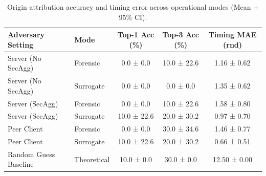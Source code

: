 \begin{table}[t]
\centering
\small
\caption{Origin attribution accuracy and timing error across operational modes (Mean $\pm$ 95\% CI).}
\label{tab:attack}
\begin{tabular}{llccc}
\toprule
Adversary Setting & Mode & Top-1 Acc (\%) & Top-3 Acc (\%) & Timing MAE (rnd) \\
\midrule
Server (No SecAgg) & Forensic & 0.0 ± 0.0 & 10.0 ± 22.6 & 1.16 ± 0.62 \\
Server (No SecAgg) & Surrogate & 0.0 ± 0.0 & 0.0 ± 0.0 & 1.35 ± 0.62 \\
Server (SecAgg) & Forensic & 0.0 ± 0.0 & 10.0 ± 22.6 & 1.58 ± 0.80 \\
Server (SecAgg) & Surrogate & 10.0 ± 22.6 & 20.0 ± 30.2 & 0.97 ± 0.70 \\
Peer Client & Forensic & 0.0 ± 0.0 & 30.0 ± 34.6 & 1.46 ± 0.77 \\
Peer Client & Surrogate & 10.0 ± 22.6 & 20.0 ± 30.2 & 0.66 ± 0.51 \\
Random Guess Baseline & Theoretical & 10.0 ± 0.0 & 30.0 ± 0.0 & 12.50 ± 0.00 \\
\bottomrule
\end{tabular}
\end{table}
